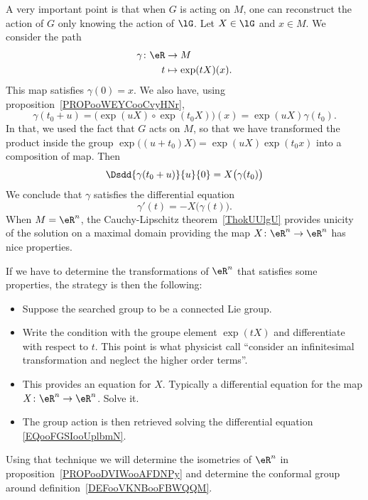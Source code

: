 A very important point\cite{ooOLNIooDLmxkR} is that when \( G\) is acting on $M$, one can reconstruct the action of \( G\) only knowing the action of \( \lG\). Let \( X\in \lG\) and \( x\in M\). We consider the path
\begin{equation}
    \begin{aligned}
        \gamma\colon \eR&\to M \\
        t&\mapsto \exp(tX)(x).
    \end{aligned}
\end{equation}
This map satisfies \( \gamma(0)=x\). We also have, using proposition~\ref{PROPooWEYCooCvyHNr},
\begin{equation}
    \gamma(t_0+u)=\big( \exp(uX)\circ\exp(t_0X)\big)(x)=\exp(uX)\gamma(t_0).
\end{equation}
In that, we used the fact that \( G\) acts on \( M\), so that we have transformed the product inside the group \( \exp\big( (u+t_0)X \big)= \exp(uX)\exp(t_0x) \) into a composition of map.  Then
\begin{equation}
    \Dsdd{ \gamma(t_0+u) }{u}{0}=X\big( \gamma(t_0) \big)
\end{equation}
We conclude that \( \gamma\) satisfies the differential equation
\begin{equation}        \label{EQooFGSIooUplbmN}
    \gamma'(t)=-X\big( \gamma(t) \big).
\end{equation}
When \( M=\eR^n\), the Cauchy-Lipschitz theorem~\ref{ThokUUlgU} provides unicity of the solution on a maximal domain providing the map \( X\colon \eR^n\to \eR^n\) has nice properties.

\begin{normaltext}      \label{NORMooMGAUooIoLtjW}
    If we have to determine the transformations of \( \eR^n\) that satisfies some properties, the strategy is then the following:
    \begin{itemize}
        \item Suppose the searched group to be a connected Lie group.
        \item Write the condition with the groupe element \( \exp(tX)\) and differentiate with respect to \( t\). This point is what physicist call ``consider an infinitesimal transformation and neglect the higher order terms''.
        \item This provides an equation for \( X\). Typically a differential equation for the map \( X\colon \eR^n\to \eR^n\). Solve it.
        \item The group action is then retrieved solving the differential equation \eqref{EQooFGSIooUplbmN}.
    \end{itemize}
    Using that technique we will determine the isometries of \( \eR^n\) in proposition~\ref{PROPooDVIWooAFDNPy} and determine the conformal group around definition~\ref{DEFooVKNBooFBWQQM}.  %
\end{normaltext}

